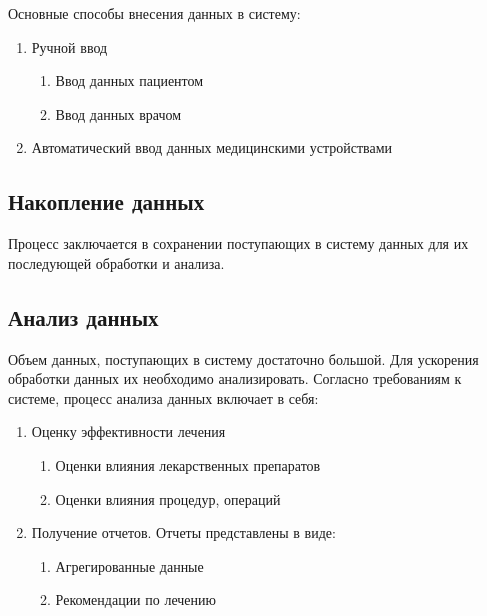 Основные способы внесения данных в систему:

\begin{enumerate}
  \item Ручной ввод
  \begin{enumerate}
    \item Ввод данных пациентом
    \item Ввод данных врачом
  \end{enumerate}
  \item Автоматический ввод данных медицинскими устройствами
\end{enumerate}

\subsection{Накопление данных}
Процесс заключается в сохранении поступающих в систему данных для их последующей
обработки и анализа.

\subsection{Анализ данных}
Объем данных, поступающих в систему достаточно большой. Для ускорения обработки
данных их необходимо анализировать. Согласно требованиям к системе, процесс
анализа данных включает в себя:

\begin{enumerate}
  \item Оценку эффективности лечения
  \begin{enumerate}
    \item Оценки влияния лекарственных препаратов
    \item Оценки влияния процедур, операций 
  \end{enumerate}
  \item Получение отчетов. Отчеты представлены в виде:
  \begin{enumerate}
    \item Агрегированные данные
    \item Рекомендации по лечению
  \end{enumerate}  
\end{enumerate}










